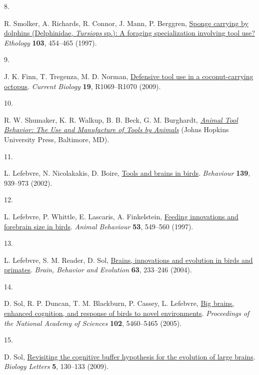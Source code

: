 \documentclass[
  man,floatsintext]{apa6}
\newlength{\cslhangindent}
\newlength{\csllabelwidth}
\newlength{\cslentryspacingunit} %
\newenvironment{CSLReferences}[2] %
 {%
  \setlength{\parindent}{0pt}
  \ifodd #1
  \let\oldpar\par
  \def\par{\hangindent=\cslhangindent\oldpar}
  \fi
  \setlength{\parskip}{#2\cslentryspacingunit}
 }%
 {}
\newcommand{\CSLLeftMargin}[1]{\parbox[t]{\csllabelwidth}{#1}}
\newcommand{\CSLRightInline}[1]{\parbox[t]{\linewidth - \csllabelwidth}{#1}\break}
\begin{document}
\begin{CSLReferences}{0}{0}
\leavevmode{}%
\CSLLeftMargin{8. }%
\CSLRightInline{R. Smolker, A. Richards, R. Connor, J. Mann, P. Berggren, \href{https://doi.org/10.1111/j.1439-0310.1997.tb00160.x}{Sponge carrying by dolphins ({D}elphinidae, \emph{{T}ursiops} sp.): A foraging specialization involving tool use?} \emph{Ethology} \textbf{103}, 454--465 (1997).}

\leavevmode{}%
\CSLLeftMargin{9. }%
\CSLRightInline{J. K. Finn, T. Tregenza, M. D. Norman, \href{https://doi.org/10.1016/j.cub.2009.10.052}{Defensive tool use in a coconut-carrying octopus}. \emph{Current Biology} \textbf{19}, R1069--R1070 (2009).}

\leavevmode{}%
\CSLLeftMargin{10. }%
\CSLRightInline{R. W. Shumaker, K. R. Walkup, B. B. Beck, G. M. Burghardt, \emph{\href{https://doi.org/10.1353/book.98237}{Animal Tool Behavior: The Use and Manufacture of Tools by Animals}} (Johns Hopkins University Press, Baltimore, MD).}

\leavevmode{}%
\CSLLeftMargin{11. }%
\CSLRightInline{L. Lefebvre, N. Nicolakakis, D. Boire, \href{https://doi.org/10.1163/156853902320387918}{Tools and brains in birds}. \emph{Behaviour} \textbf{139}, 939--973 (2002).}

\leavevmode{}%
\CSLLeftMargin{12. }%
\CSLRightInline{L. Lefebvre, P. Whittle, E. Lascaris, A. Finkelstein, \href{https://doi.org/10.1006/anbe.1996.0330}{Feeding innovations and forebrain size in birds}. \emph{Animal Behaviour} \textbf{53}, 549--560 (1997).}

\leavevmode{}%
\CSLLeftMargin{13. }%
\CSLRightInline{L. Lefebvre, S. M. Reader, D. Sol, \href{https://doi.org/10.1159/000076784}{Brains, innovations and evolution in birds and primates}. \emph{Brain, Behavior and Evolution} \textbf{63}, 233--246 (2004).}

\leavevmode{}%
\CSLLeftMargin{14. }%
\CSLRightInline{D. Sol, R. P. Duncan, T. M. Blackburn, P. Cassey, L. Lefebvre, \href{https://doi.org/10.1073/pnas.0408145102}{Big brains, enhanced cognition, and response of birds to novel environments}. \emph{Proceedings of the National Academy of Sciences} \textbf{102}, 5460--5465 (2005).}

\leavevmode{}%
\CSLLeftMargin{15. }%
\CSLRightInline{D. Sol, \href{https://doi.org/10.1098/rsbl.2008.0621}{Revisiting the cognitive buffer hypothesis for the evolution of large brains}. \emph{Biology Letters} \textbf{5}, 130--133 (2009).}


\end{CSLReferences}
\end{document}
